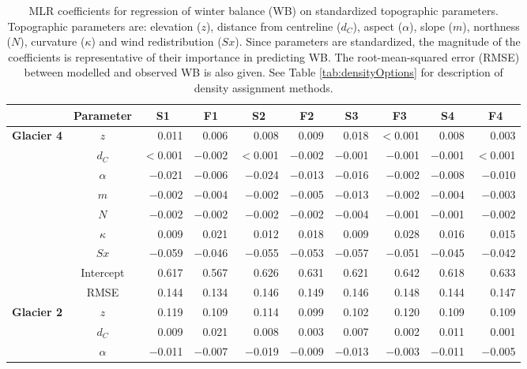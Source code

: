 \documentclass{sfuthesis}
\newcommand{\params}{Topographic parameters are: elevation ($z$), distance from centreline ($d_C$), aspect ($\alpha$), slope ($m$), northness ($N$), curvature ($\kappa$) and wind redistribution ($Sx$). }
\begin{document}
\begin{table}
\footnotesize
\centering
\caption[MLR coefficients for regression of winter balance (WB) on standardized topographic parameters]{MLR coefficients for regression of winter balance (WB) on standardized topographic parameters. \params  Since parameters are standardized, the magnitude of the coefficients is representative of their importance in predicting WB. The root-mean-squared error (RMSE) between modelled and observed WB is also given. See Table \ref{tab:densityOptions} for description of density assignment methods.}
\label{tab:MLRcoeffFull}
\begin{tabular}{ccrrrrrrrr}
 & \textbf{Parameter} & \multicolumn{1}{c}{\textbf{S1}} & \multicolumn{1}{c}{\textbf{F1}} & \multicolumn{1}{c}{\textbf{S2}} & \multicolumn{1}{c}{\textbf{F2}} & \multicolumn{1}{c}{\textbf{S3}} & \multicolumn{1}{c}{\textbf{F3}} & \multicolumn{1}{c}{\textbf{S4}} & \multicolumn{1}{c}{\textbf{F4}} \\ \hline \hline
\multirow{9}{*}{\textbf{Glacier 4}} & $z$ & 0.011 & 0.006 & 0.008 & 0.009 & 0.018 & $<$0.001 & 0.008 & 0.003 \\
 & $d_C$ & $<$0.001 & $-$0.002 & $<$0.001 & $-$0.002 & $-$0.001 & $-$0.001 & $-$0.001 & $<$0.001 \\
 & $\alpha$ & $-$0.021 & $-$0.006 & $-$0.024 & $-$0.013 & $-$0.016 & $-$0.002 & $-$0.008 & $-$0.010 \\
 & $m$ & $-$0.002 & $-$0.004 & $-$0.002 & $-$0.005 & $-$0.013 & $-$0.002 & $-$0.004 & $-$0.003 \\
 & $N$ & $-$0.002 & $-$0.002 & $-$0.002 & $-$0.002 & $-$0.004 & $-$0.001 & $-$0.001 & $-$0.002 \\
 & $\kappa$ & 0.009 & 0.021 & 0.012 & 0.018 & 0.009 & 0.028 & 0.016 & 0.015 \\
 & $Sx$ & $-$0.059 & $-$0.046 & $-$0.055 & $-$0.053 & $-$0.057 & $-$0.051 & $-$0.045 & $-$0.042 \\
 & Intercept & 0.617 & 0.567 & 0.626 & 0.631 & 0.621 & 0.642 & 0.618 & 0.633 \\
 & RMSE & 0.144 & 0.134 & 0.146 & 0.149 & 0.146 & 0.148 & 0.144 & 0.147 \\ \hline
\multirow{9}{*}{\textbf{Glacier 2}} & $z$ & 0.119 & 0.109 & 0.114 & 0.099 & 0.102 & 0.120 & 0.109 & 0.109 \\
 & $d_C$ & 0.009 & 0.021 & 0.008 & 0.003 & 0.007 & 0.002 & 0.011 & 0.001 \\
 & $\alpha$ & $-$0.011 & $-$0.007 & $-$0.019 & $-$0.009 & $-$0.013 & $-$0.003 & $-$0.011 & $-$0.005 \\

\end{tabular}
\end{table}
\end{document}
